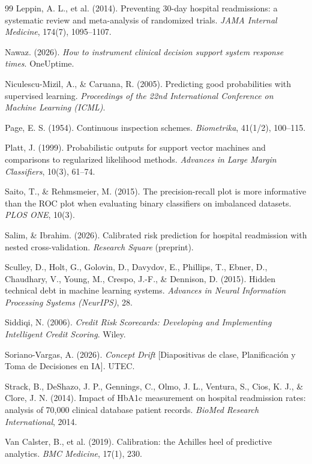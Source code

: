 \documentclass[11pt,a4paper]{article}
\begin{document}
\begin{thebibliography}{99}
 Leppin, A. L., et al. (2014). Preventing 30-day hospital readmissions: a systematic review and meta-analysis of randomized trials. \emph{JAMA Internal Medicine}, 174(7), 1095--1107.

 Nawaz. (2026). \emph{How to instrument clinical decision support system response times}. OneUptime.

 Niculescu-Mizil, A., \& Caruana, R. (2005). Predicting good probabilities with supervised learning. \emph{Proceedings of the 22nd International Conference on Machine Learning (ICML)}.

 Page, E. S. (1954). Continuous inspection schemes. \emph{Biometrika}, 41(1/2), 100--115.

 Platt, J. (1999). Probabilistic outputs for support vector machines and comparisons to regularized likelihood methods. \emph{Advances in Large Margin Classifiers}, 10(3), 61--74.

 Saito, T., \& Rehmsmeier, M. (2015). The precision-recall plot is more informative than the ROC plot when evaluating binary classifiers on imbalanced datasets. \emph{PLOS ONE}, 10(3).

 Salim, \& Ibrahim. (2026). Calibrated risk prediction for hospital readmission with nested cross-validation. \emph{Research Square} (preprint).

 Sculley, D., Holt, G., Golovin, D., Davydov, E., Phillips, T., Ebner, D., Chaudhary, V., Young, M., Crespo, J.-F., \& Dennison, D. (2015). Hidden technical debt in machine learning systems. \emph{Advances in Neural Information Processing Systems (NeurIPS)}, 28.

 Siddiqi, N. (2006). \emph{Credit Risk Scorecards: Developing and Implementing Intelligent Credit Scoring}. Wiley.

 Soriano-Vargas, A. (2026). \emph{Concept Drift} [Diapositivas de clase, Planificación y Toma de Decisiones en IA]. UTEC.

 Strack, B., DeShazo, J. P., Gennings, C., Olmo, J. L., Ventura, S., Cios, K. J., \& Clore, J. N. (2014). Impact of HbA1c measurement on hospital readmission rates: analysis of 70,000 clinical database patient records. \emph{BioMed Research International}, 2014.

 Van Calster, B., et al. (2019). Calibration: the Achilles heel of predictive analytics. \emph{BMC Medicine}, 17(1), 230.


\end{thebibliography}
\end{document}
